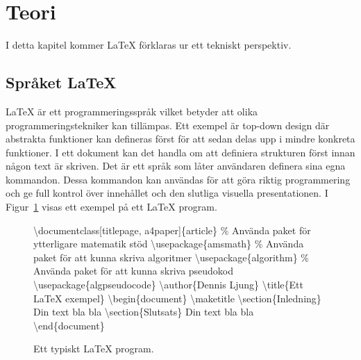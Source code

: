 \section{Teori}
I detta kapitel kommer {\LaTeX} förklaras ur ett tekniskt perspektiv. 

\subsection{Språket {\LaTeX}} 
{\LaTeX} är ett programmeringsspråk vilket betyder att olika programmeringstekniker kan tillämpas. Ett exempel är top-down design där abstrakta funktioner kan defineras först för att sedan delas upp i mindre konkreta funktioner. I ett dokument kan det handla om att definiera strukturen först innan någon text är skriven. \citep{latexandfriends}
\newline
\newline
Det är ett språk som låter användaren definera sina egna kommandon. Dessa kommandon kan användas för att göra riktig programmering och ge full kontrol över innehållet och den slutliga visuella presentationen. \citep{latexandfriends}
\newline
\newline
I Figur~\ref{fig:latexexempel} visas ett exempel på ett {\LaTeX} program. 
  
\begin{figure}[ht]
	\noindent\makebox[\linewidth]{\rule{\textwidth}{0.4pt}}
	\textbackslash documentclass[titlepage, a4paper]\{article\}
	\newline
	\newline
	\% Använda paket för ytterligare matematik stöd
	\newline
	\textbackslash usepackage\{amsmath\}
	\newline
	\% Använda paket för att kunna skriva algoritmer
	\newline
	\textbackslash usepackage\{algorithm\}
	\newline
	\% Använda paket för att kunna skriva pseudokod
	\newline
	\textbackslash usepackage\{algpseudocode\}
	\newline
	\newline
	\textbackslash author\{Dennis Ljung\}
	\newline
	\textbackslash title\{Ett {\LaTeX} exempel\}
	\newline
	\newline
	\textbackslash begin\{document\}
	\newline
	\textbackslash maketitle
	\newline
	\textbackslash section\{Inledning\}
	\newline
	Din text bla bla
	\newline
	\textbackslash section\{Slutsats\}
	\newline
	Din text bla bla
	\newline
	\textbackslash end\{document\}
	\newline
	\noindent\makebox[\linewidth]{\rule{\textwidth}{0.4pt}}
\caption{Ett typiskt {\LaTeX} program.}
\label{fig:latexexempel}
\end{figure} 

